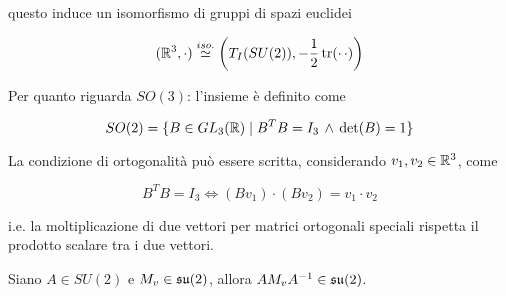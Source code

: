 questo induce un isomorfismo di gruppi di spazi euclidei

\begin{equation}
	(\mathbb{R}^{3},\cdot) \stackrel{iso.}{\simeq} \left( T_{I}(SU(2)), -\dfrac{1}{2} \tr(\cdot \, \cdot) \right)
\end{equation}

Per quanto riguarda $ SO(3) $: l'insieme è definito come

\begin{equation}
	SO(2) = \{ B \in GL_{3}(\mathbb{R}) \mid B^{T} B = I_{3} \, \wedge \, \det(B) = 1 \}
\end{equation}

La condizione di ortogonalità può essere scritta, considerando $ v_{1},v_{2} \in \mathbb{R}^{3} $, come

\begin{equation}
	B^{T} B = I_{3} %
	\iff %
	(B v_{1}) \cdot (B v_{2}) = v_{1} \cdot v_{2}
\end{equation}

i.e. la moltiplicazione di due vettori per matrici ortogonali speciali rispetta il prodotto scalare tra i due vettori.

\begin{lemma}
	Siano $ A \in SU(2) $ e $ M_{v} \in \mathfrak{su}(2) $, allora $ A M_{v} A^{-1} \in \mathfrak{su}(2) $.
\end{lemma}

